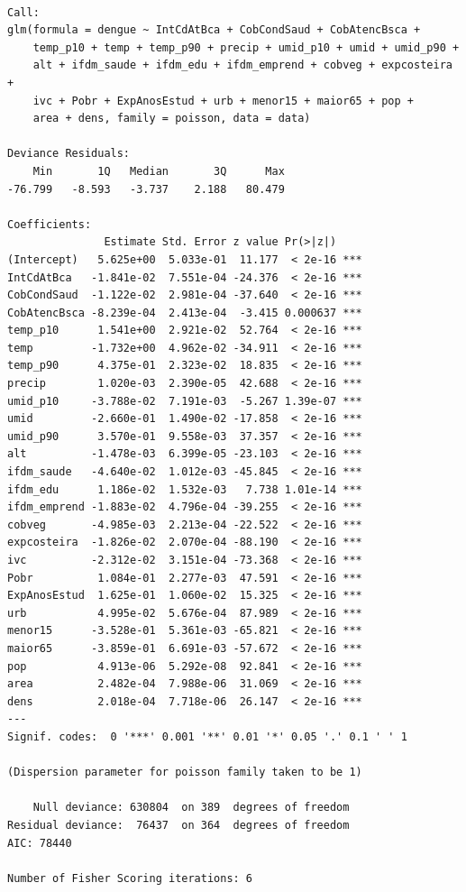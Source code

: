 \documentclass[12pt,a4paper]{article}\usepackage[]{graphicx}\usepackage[]{color}
\makeatletter
\newenvironment{kframe}{%
 \def\at@end@of@kframe{}%
 \ifinner\ifhmode%
  \def\at@end@of@kframe{\end{minipage}}%
  \begin{minipage}{\columnwidth}%
 \fi\fi%
 \def\FrameCommand##1{\hskip\@totalleftmargin \hskip-\fboxsep
 \colorbox{shadecolor}{##1}\hskip-\fboxsep
     \hskip-\linewidth \hskip-\@totalleftmargin \hskip\columnwidth}%
 \MakeFramed {\advance\hsize-\width
   \@totalleftmargin\z@ \linewidth\hsize
   \@setminipage}}%
 {\par\unskip\endMakeFramed%
 \at@end@of@kframe}
\newenvironment{knitrout}{}{} %
\makeatother
\begin{document}
\begin{knitrout}
\color{fgcolor}\begin{kframe}
\begin{verbatim}

Call:
glm(formula = dengue ~ IntCdAtBca + CobCondSaud + CobAtencBsca + 
    temp_p10 + temp + temp_p90 + precip + umid_p10 + umid + umid_p90 + 
    alt + ifdm_saude + ifdm_edu + ifdm_emprend + cobveg + expcosteira + 
    ivc + Pobr + ExpAnosEstud + urb + menor15 + maior65 + pop + 
    area + dens, family = poisson, data = data)

Deviance Residuals: 
    Min       1Q   Median       3Q      Max  
-76.799   -8.593   -3.737    2.188   80.479  

Coefficients:
               Estimate Std. Error z value Pr(>|z|)    
(Intercept)   5.625e+00  5.033e-01  11.177  < 2e-16 ***
IntCdAtBca   -1.841e-02  7.551e-04 -24.376  < 2e-16 ***
CobCondSaud  -1.122e-02  2.981e-04 -37.640  < 2e-16 ***
CobAtencBsca -8.239e-04  2.413e-04  -3.415 0.000637 ***
temp_p10      1.541e+00  2.921e-02  52.764  < 2e-16 ***
temp         -1.732e+00  4.962e-02 -34.911  < 2e-16 ***
temp_p90      4.375e-01  2.323e-02  18.835  < 2e-16 ***
precip        1.020e-03  2.390e-05  42.688  < 2e-16 ***
umid_p10     -3.788e-02  7.191e-03  -5.267 1.39e-07 ***
umid         -2.660e-01  1.490e-02 -17.858  < 2e-16 ***
umid_p90      3.570e-01  9.558e-03  37.357  < 2e-16 ***
alt          -1.478e-03  6.399e-05 -23.103  < 2e-16 ***
ifdm_saude   -4.640e-02  1.012e-03 -45.845  < 2e-16 ***
ifdm_edu      1.186e-02  1.532e-03   7.738 1.01e-14 ***
ifdm_emprend -1.883e-02  4.796e-04 -39.255  < 2e-16 ***
cobveg       -4.985e-03  2.213e-04 -22.522  < 2e-16 ***
expcosteira  -1.826e-02  2.070e-04 -88.190  < 2e-16 ***
ivc          -2.312e-02  3.151e-04 -73.368  < 2e-16 ***
Pobr          1.084e-01  2.277e-03  47.591  < 2e-16 ***
ExpAnosEstud  1.625e-01  1.060e-02  15.325  < 2e-16 ***
urb           4.995e-02  5.676e-04  87.989  < 2e-16 ***
menor15      -3.528e-01  5.361e-03 -65.821  < 2e-16 ***
maior65      -3.859e-01  6.691e-03 -57.672  < 2e-16 ***
pop           4.913e-06  5.292e-08  92.841  < 2e-16 ***
area          2.482e-04  7.988e-06  31.069  < 2e-16 ***
dens          2.018e-04  7.718e-06  26.147  < 2e-16 ***
---
Signif. codes:  0 '***' 0.001 '**' 0.01 '*' 0.05 '.' 0.1 ' ' 1

(Dispersion parameter for poisson family taken to be 1)

    Null deviance: 630804  on 389  degrees of freedom
Residual deviance:  76437  on 364  degrees of freedom
AIC: 78440

Number of Fisher Scoring iterations: 6
\end{verbatim}
\end{kframe}
\end{knitrout}
\end{document}
